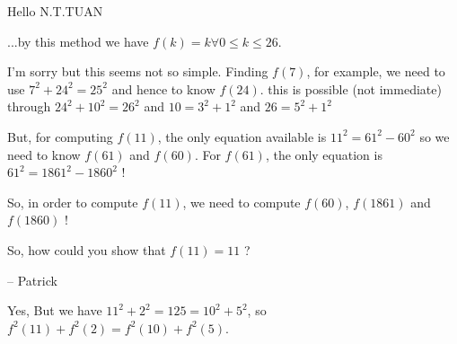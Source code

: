 \begin{mysolution}
	Hello N.T.TUAN
\begin{tcolorbox}...by this method we have $f(k)=k\forall 0\leq k\leq 26$.\end{tcolorbox}

I'm sorry but this seems not so simple.
Finding $f(7)$, for example, we need to use $7^{2}+24^{2}=25^{2}$ and hence to know $f(24)$. this is possible (not immediate) through $24^{2}+10^{2}=26^{2}$ and $10=3^{2}+1^{2}$ and $26=5^{2}+1^{2}$ 

But, for computing $f(11)$, the only equation available is $11^{2}= 61^{2}-60^{2}$ so we need to know $f(61)$ and $f(60)$. For $f(61)$, the only equation is $61^{2}=1861^{2}-1860^{2}$ !

So, in order to compute $f(11)$, we need to compute $f(60)$, $f(1861)$ and $f(1860)$ !

So, how could you show that $f(11)=11$ ?

-- 
Patrick
\end{mysolution}






\begin{mysolution}
	Yes, But we have $11^{2}+2^{2}=125=10^{2}+5^{2}$, so $f^{2}(11)+f^{2}(2)=f^{2}(10)+f^{2}(5)$.
\end{mysolution}



